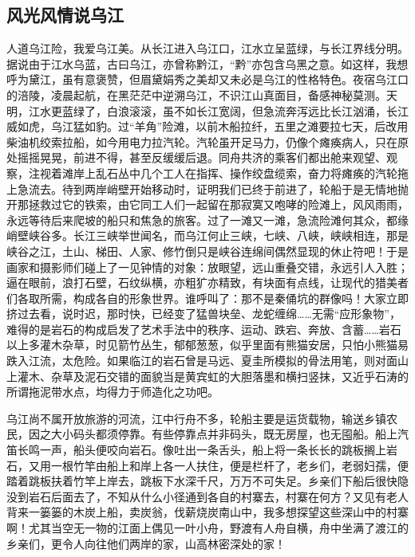 \documentclass{article}
\begin{document}
\subsection{风光风情说乌江}
人道乌江险，我爱乌江美。从长江进入乌江口，江水立呈蓝绿，与长江界线分明。据说由于江水乌蓝，古曰乌江，亦曾称黔江，“黔”亦包含乌黑之意。如这样，我想呼为黛江，虽有意褒赞，但眉黛娟秀之美却又未必是乌江的性格特色。夜宿乌江口的涪陵，凌晨起航，在黑茫茫中逆溯乌江，不识江山真面目，备感神秘莫测。天明，江水更蓝绿了，白浪滚滚，虽不如长江宽阔，但急流奔泻远比长江汹涌，长江威如虎，乌江猛如豹。过“羊角”险滩，以前木船拉纤，五里之滩要拉七天，后改用柴油机绞索拉船，如今用电力拉汽轮。汽轮虽开足马力，仍像个瘫痪病人，只在原处摇摇晃晃，前进不得，甚至反缓缓后退。同舟共济的乘客们都出舱来观望、观察，注视着滩岸上乱石丛中几个工人在指挥、操作绞盘缆索，奋力将瘫痪的汽轮拖上急流去。待到两岸峭壁开始移动时，证明我们已终于前进了，轮船于是无情地抛开那拯救过它的铁索，由它同工人们一起留在那寂寞又咆哮的险滩上，风风雨雨，永远等待后来爬坡的船只和焦急的旅客。过了一滩又一滩，急流险滩何其众，都缘峭壁峡谷多。长江三峡举世闻名，而乌江何止三峡，七峡、八峡，峡峡相连，那是峡谷之江，土山、梯田、人家、修竹倒只是峡谷连绵间偶然显现的休止符吧！于是画家和摄影师们碰上了一见钟情的对象：放眼望，远山重叠交错，永远引人入胜；逼在眼前，浪打石壁，石纹纵横，亦粗犷亦精致，有块面有点线，让现代的猎美者们各取所需，构成各自的形象世界。谁呼叫了：那不是秦俑坑的群像吗！大家立即挤过去看，说时迟，那时快，已经变了猛兽块垒、龙蛇缠绵……无需“应形象物”，难得的是岩石的构成启发了艺术手法中的秩序、运动、跌宕、奔放、含蓄……岩石以上多灌木杂草，时见箭竹丛生，郁郁葱葱，似乎里面有熊猫安居，只怕小熊猫易跌入江流，太危险。如果临江的岩石曾是马远、夏圭所模拟的骨法用笔，则对面山上灌木、杂草及泥石交错的面貌当是黄宾虹的大胆落墨和横扫竖抹，又近乎石涛的所谓拖泥带水点，均得力于师造化之功吧。

乌江尚不属开放旅游的河流，江中行舟不多，轮船主要是运货载物，输送乡镇农民，因之大小码头都须停靠。有些停靠点并非码头，既无房屋，也无囤船。船上汽笛长鸣一声，船头便咬向岩石。像吐出一条舌头，船上将一条长长的跳板搁上岩石，又用一根竹竿由船上和岸上各一人扶住，便是栏杆了，老乡们，老弱妇孺，便踏着跳板扶着竹竿上岸去，跳板下水深千尺，万万不可失足。乡亲们下船后很快隐没到岩石后面去了，不知从什么小径通到各自的村寨去，村寨在何方？又见有老人背来一篓篓的木炭上船，卖炭翁，伐薪烧炭南山中，我多想探望这些深山中的村寨啊！尤其当空无一物的江面上偶见一叶小舟，野渡有人舟自横，舟中坐满了渡江的乡亲们，更令人向往他们两岸的家，山高林密深处的家！
\end{document}
